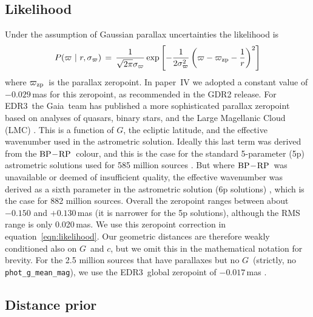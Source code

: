 \documentclass[twocolumn]{aastex62}
\providecommand{\given}{\ensuremath{\hspace{0.05em}\mid\hspace{0.05em}}}
\providecommand{\given}{\ensuremath{\hspace{0.01em}\mid\hspace{0.01em}}}
\providecommand{\gaia}{Gaia}
\providecommand{\gdr}[1]{GDR{#1}}
\providecommand{\release}{EDR3}
\providecommand{\gmag}{\ensuremath{G}}
\providecommand{\bprp}{\ensuremath{{\rm BP} \! - \! {\rm RP}}}
\providecommand{\cc}{\ensuremath{c}}
\providecommand{\parallax}{\ensuremath{\varpi}}
\providecommand{\parallaxzp}{\ensuremath{\varpi_{\rm zp}}}
\providecommand{\sigparallax}{\ensuremath{\sigma_{\varpi}}}
\providecommand{\dist}{\ensuremath{r}}
\begin{document}
\subsection{Likelihood}\label{sec:likelihood}

Under the assumption of Gaussian parallax uncertainties the likelihood is
\begin{equation}
P(\parallax \given \dist, \sigparallax) \,=\, \frac{1}{\sqrt{2 \pi}\sigparallax} \exp{ \left[ -\frac{1}{2\sigparallax^2}\left(\parallax-\parallaxzp-\frac{1}{r}\right)^2 \right] } 
\label{eqn:likelihood}
\end{equation}
where \parallaxzp\ is the parallax zeropoint. In paper~IV we adopted a constant value of $-0.029$\,mas for this zeropoint, as recommended in the \gdr{2} release. For \release\ the \gaia\ team has published a more sophisticated parallax zeropoint based on analyses of quasars, binary stars, and the Large Magellanic Cloud (LMC) \citep{lindegren_etal_gedr3_parallaxzp}. This is a function of \gmag, the ecliptic latitude, and the effective wavenumber used in the astrometric solution. Ideally this last term was derived from the \bprp\ colour, and this is the case for the standard 5-parameter (5p) astrometric solutions used for 585 million sources \citep{gedr3_release}. But where \bprp\ was unavailable or deemed of insufficient quality, the effective wavenumber was derived as a sixth parameter in the astrometric solution (6p solutions) \citep{lindegren_etal_gedr3_astrometry}, which is the case for 882 million sources. Overall the zeropoint ranges between about $-0.150$ and $+0.130$\,mas (it is narrower for the 5p solutions), although the RMS range is only 0.020\,mas. 
We use this zeropoint correction in equation~\ref{eqn:likelihood}. Our geometric distances are therefore weakly conditioned also on \gmag\ and \cc, but we omit this in the mathematical notation for brevity. For the 2.5 million sources that have parallaxes but no \gmag\ (strictly, no {\tt phot\_g\_mean\_mag}), we use the \release\ global zeropoint of $-0.017$\,mas \citep{lindegren_etal_gedr3_astrometry}.


\subsection{Distance prior}\label{sec:distance_prior}
\end{document}
